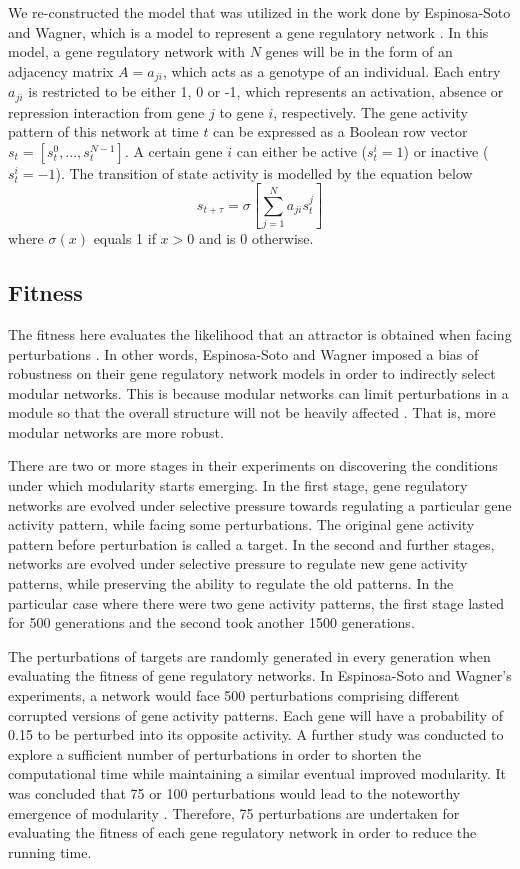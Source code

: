We re-constructed the model that was utilized in the work done by Espinosa-Soto and Wagner, which is a model to represent a gene regulatory network \cite{espinosa2010specialization}. In this model, a gene regulatory network with $N$ genes will be in the form of an adjacency matrix $A = a_{ji}$, which acts as a genotype of an individual. Each entry $a_{ji}$ is restricted to be either 1, 0 or -1, which represents an activation, absence or repression interaction from gene $j$ to gene $i$, respectively. The gene activity pattern of this network at time $t$ can be expressed as a Boolean row vector $s_{t} = [s_{t}^0,...,s_{t}^{N-1}]$. A certain gene $i$ can either be active ($s_t^i=1$) or inactive ($s_t^i=-1$). The transition of state activity is modelled by the equation below
\begin{equation}
s_{t+\tau}=\sigma[\sum_{j=1}^{N}a_{ji}s_t^j]
\end{equation}
where $\sigma(x)$ equals 1 if $x>0$ and is 0 otherwise. 

\subsection{Fitness}
The fitness here evaluates the likelihood that an attractor is obtained when facing perturbations \cite{espinosa2010specialization}. In other words, Espinosa-Soto and Wagner imposed a bias of robustness on their gene regulatory network models in order to indirectly select modular networks. This is because modular networks can limit perturbations in a module so that the overall structure will not be heavily affected \cite{aderems2005systems}. That is, more modular networks are more robust. 

There are two or more stages in their experiments on discovering the conditions under which modularity starts emerging. In the first stage, gene regulatory networks are evolved under selective pressure towards regulating a particular gene activity pattern, while facing some perturbations. The original gene activity pattern before perturbation is called a target. In the second and further stages, networks are evolved under selective pressure to regulate new gene activity patterns, while preserving the ability to regulate the old patterns. In the particular case where there were two gene activity patterns, the first stage lasted for 500 generations and the second took another 1500 generations. 

The perturbations of targets are randomly generated in every generation when evaluating the fitness of gene regulatory networks. In Espinosa-Soto and Wagner's experiments, a network would face 500 perturbations comprising different corrupted versions of gene activity patterns. Each gene will have a probability of 0.15 to be perturbed into its opposite activity. A further study was conducted to explore a sufficient number of perturbations in order to shorten the computational time while maintaining a similar eventual improved modularity. It was concluded that 75 or 100 perturbations would lead to the noteworthy emergence of modularity \cite{totten2015exploring}. Therefore, 75 perturbations are undertaken for evaluating the fitness of each gene regulatory network in order to reduce the running time. 

